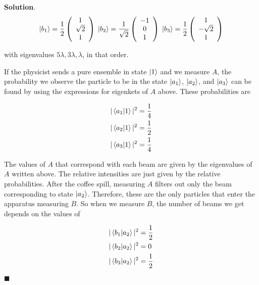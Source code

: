 \documentclass[12pt]{article}
\theoremstyle{definition}
\newenvironment{s}{%
        \begin{trivlist} \item \textbf{Solution}. }{%
            \hspace*{\fill} $\blacksquare$\end{trivlist}}%
\begin{document}
{\begin{s}
\begin{equation*}
\ket{b_{1}} = \frac{1}{2}\left(
\begin{array}{ccc}
 1 \\\sqrt{2} \\ 1 \\
\end{array}
\right)\;
\ket{b_{2}} = \frac{1}{\sqrt{2}}\left(
\begin{array}{ccc}
 -1 \\ 0 \\ 1 \\
\end{array}
\right)\;
\ket{b_{3}} = \frac{1}{2}\left(
\begin{array}{ccc}
 1 \\ -\sqrt{2} \\ 1 \\
\end{array}
\right)
\end{equation*}

with eigenvalues $5\lambda, 3\lambda, \lambda$, in that order. 


If the physicist sends a pure ensemble in state $\ket{1}$ and we measure $A$, the probability we observe the particle to be in the state $\ket{a_{1}}$, $\ket{a_{2}}$, and $\ket{a_{3}}$ can be found by using the expressions for eigenkets of $A$ above. These probabilities are 

\begin{align*}
|\bra{a_{1}}\ket{1}|^{2} &= \frac{1}{4}\\
|\bra{a_{2}}\ket{1}|^{2} &= \frac{1}{2}\\
|\bra{a_{3}}\ket{1}|^{2} &= \frac{1}{4}
\end{align*}

The values of $A$ that correspond with each beam are given by the eigenvalues of $A$ written above. The relative intensities are just given by the relative probabilities. After the coffee spill, measuring $A$ filters out only the beam corresponding to state $\ket{a_{2}}$. Therefore, these are the only particles that enter the apparatus measuring $B$. So when we measure $B$, the number of beams we get depends on the values of

\begin{align*}
|\bra{b_{1}}\ket{a_{2}}|^{2} &= \frac{1}{2}\\
|\bra{b_{2}}\ket{a_{2}}|^{2} &= 0\\
|\bra{b_{3}}\ket{a_{2}}|^{2} &= \frac{1}{2}
\end{align*}


\end{s}}
\end{document}
